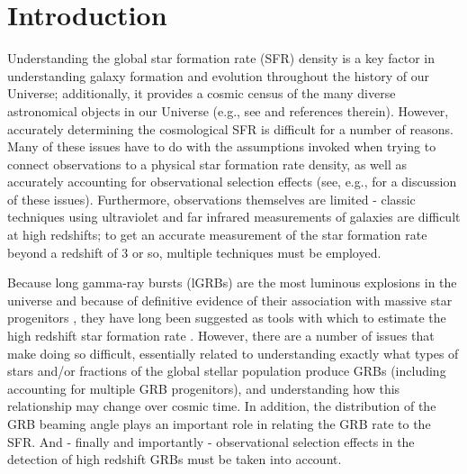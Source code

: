 \documentclass[fleqn,usenatbib,useAMS]{mnras}
\begin{document}
 
 


\section{Introduction}

 Understanding the global star formation rate (SFR) density is a key factor in understanding galaxy formation and evolution throughout the history of our Universe; additionally, it provides a cosmic census of the many diverse astronomical objects in our Universe (e.g., see \cite{HB06,Ken12,Krum14,MD14} and references therein). 
 However, accurately determining the cosmological SFR is difficult for a number of reasons. Many of these issues have to do with the assumptions invoked when trying to connect observations to a physical star formation rate density, as well as accurately accounting for observational selection effects (see, e.g., \cite{HB06, MD14} for a discussion of these issues). Furthermore, observations themselves are limited - classic techniques using ultraviolet and far infrared measurements of galaxies are difficult at high redshifts; to get an accurate measurement of the star formation rate beyond a redshift of $3$ or so, multiple techniques must be employed.
  
  
  Because long gamma-ray bursts (lGRBs) are the most luminous explosions in the universe and because of definitive evidence of their association with massive star progenitors \citep{Gal98,Hjorth03,WB06,HB12}, they have long been suggested as tools with which to estimate the high redshift star formation rate \citep{LRFRR02,Jak05, Kist08,Yuk08,Kist09,WP10,RE12, TPT13,Lien14, PKK15, Char16, Le17, Kin19, EC20}.  However, there are a number of issues that make doing so difficult, essentially related to understanding exactly what types of stars and/or fractions of the global stellar population produce GRBs (including accounting for multiple GRB progenitors), and understanding how this relationship may change over cosmic time.  In addition, the distribution of the GRB beaming angle plays an important role in relating the GRB rate to the SFR. And - finally and importantly - observational selection effects in the detection of high redshift GRBs  must be taken into account.    \\ 
  
\end{document}
